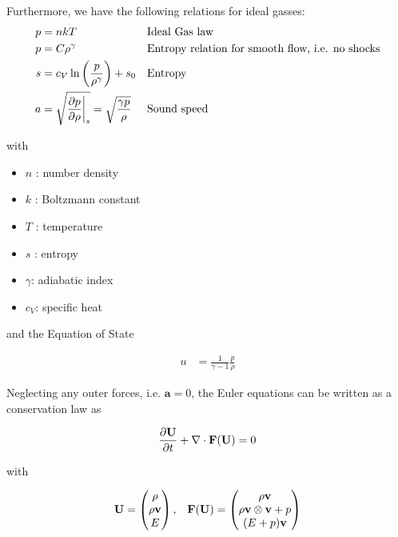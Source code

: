 Furthermore, we have the following relations for ideal gasses:
\begin{align}
p &= n k T
	&& \text{Ideal Gas law} \\
p &= C \rho ^ \gamma
	&& \text{Entropy relation for smooth flow, i.e. no shocks} \\
s &= c_V \ln \left( \frac{p}{\rho^\gamma} \right) + s_0
	&& \text{Entropy}\\
a &= \sqrt{\frac{\partial p}{\partial \rho} \bigg{|}_s } = \sqrt{\frac{\gamma p}{\rho}}
	&& \text{Sound speed}
	\label{eq:soundspeed}
\end{align}

with 
\begin{itemize}
	\item $n$ : number density
	\item $k$ : Boltzmann constant
	\item $T$ : temperature
	\item $s$ : entropy
	\item $\gamma$: adiabatic index
	\item $c_V$: specific heat 
\end{itemize}

and the Equation of State

\begin{align}
	u &= \frac{1}{\gamma - 1}\frac{p}{\rho} \label{eq:internal-energy}
\end{align}




Neglecting any outer forces, i.e. $\mathbf{a} = 0$, the Euler equations can be
written as a conservation law as

\begin{align}
    \frac{\partial  \mathbf{U} }{\partial t} + \nabla \cdot \mathbf{F}(\mathbf{U}) = 0
\end{align}

with

\begin{align}
	\mathbf{U} = 
		\begin{pmatrix}
			\rho \\ \rho \mathbf{v} \\ E
		\end{pmatrix}, &&
	\mathbf{F}(\mathbf{U}) = 
		\begin{pmatrix}
			\rho \mathbf{v}\\
			\rho \mathbf{v} \otimes \mathbf{v} + p\\
			(E + p) \mathbf{v}
		\end{pmatrix}
\end{align}









